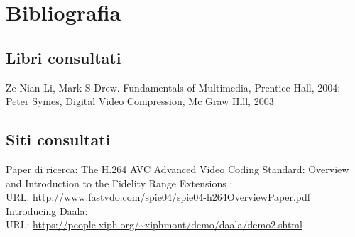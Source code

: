 

\cleardoublepage
\chapter{Bibliografia}

\nocite{*}

\bigskip
\section*{Libri consultati}
Ze-Nian Li, Mark S Drew. Fundamentals of Multimedia, Prentice Hall, 2004:\\
\newline
Peter Symes, Digital Video Compression, Mc Graw Hill, 2003

\vspace{20pt}
\section*{Siti consultati}
\noindent
Paper di ricerca: The H.264 AVC Advanced Video Coding Standard: Overview and Introduction to the Fidelity Range Extensions :\\
URL: \url{http://www.fastvdo.com/spie04/spie04-h264OverviewPaper.pdf}\\
\newline
\noindent
Introducing Daala:\\
URL: \url{https://people.xiph.org/~xiphmont/demo/daala/demo2.shtml
}\\
